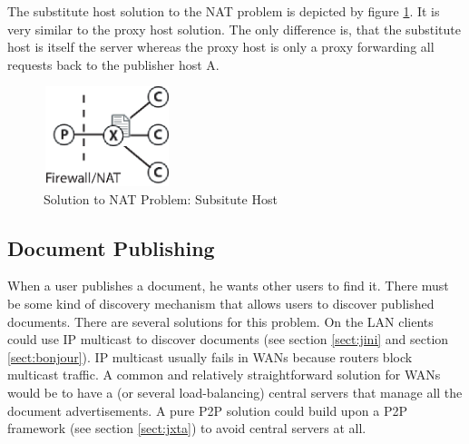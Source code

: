 \documentclass[11pt,a4paper]{article}
\begin{document}
The substitute host solution to the NAT problem is depicted by figure \ref{fig:substitute}. It is very similar to the proxy host solution. The only difference is, that the substitute host is itself the server whereas the proxy host is only a proxy forwarding all requests back to the publisher host A.

\begin{figure}[H]
 \centering
 \includegraphics[width=3.7cm,height=2.9cm]{../../images/net_substitute.eps}
 \caption{Solution to NAT Problem: Subsitute Host}
 \label{fig:substitute}
\end{figure}


\subsection{Document Publishing}
When a user publishes a document, he wants other users to find it. There must be some kind of discovery mechanism that allows users to discover published documents. There are several solutions for this problem. On the LAN clients could use IP multicast to discover documents (see section \ref{sect:jini} and section \ref{sect:bonjour}). IP multicast usually fails in WANs because routers block multicast traffic. A common and relatively straightforward solution for WANs would be to have a (or several load-balancing) central servers that manage all the document advertisements. A pure P2P solution could build upon a P2P framework (see section \ref{sect:jxta}) to avoid central servers at all.









\end{document}
